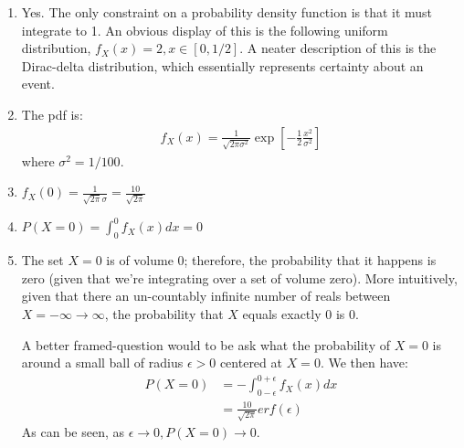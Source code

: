 \documentclass[submit]{harvardml}
\begin{document}
\begin{enumerate}[label=(\alph*)]
	\item Yes. The only constraint on a probability density function is that it must integrate to 1. An obvious display of this is the following uniform distribution, $f_X (x) = 2, x \in [0, 1/2]$. A neater description of this is the Dirac-delta distribution, which essentially represents certainty about an event.
	
	\item The pdf is:
		\begin{align}
			f_X(x) = \frac{1}{\sqrt{2\pi \sigma^2}} \exp\left[-\frac{1}{2} \frac{x^2}{\sigma^2}\right]
		\end{align}
		where $\sigma^2 = 1/100$.
	
	\item $f_X (0) =  \frac{1}{\sqrt{2\pi}\sigma} = \frac{10}{\sqrt{2\pi}}$
	\item $P(X=0) = \int_{0}^{0}{f_X(x) dx} = 0$
	\item The set $X=0$ is of volume 0; therefore, the probability that it happens is zero (given that we're integrating over a set of volume zero). More intuitively, given that there an un-countably infinite number of reals between $X= -\infty \rightarrow \infty$, the probability that $X$ equals exactly $0$ is $0$. 
	
	A better framed-question would to be ask what the probability of $X=0$ is around a small ball of radius $\epsilon > 0$ centered at $X=0$. We then have:
		\begin{align}
			P(X=0) &= -\int_{0-\epsilon}^{0+\epsilon} {f_X(x) dx} \\
					&= \frac{10}{\sqrt{2\pi}} erf(\epsilon)
		\end{align}
		As can be seen, as $\epsilon \rightarrow 0, P(X=0) \rightarrow 0$.
\end{enumerate}
\newpage
\end{document}
